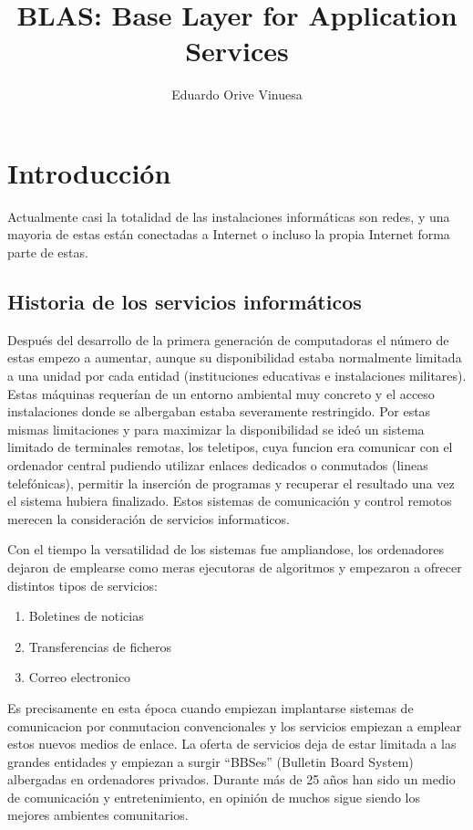 \documentclass[a4paper,spanish,12pt]{book}
\title{BLAS: Base Layer for Application Services}
\author{Eduardo Orive Vinuesa}
\begin{document}
\tableofcontents

\maketitle


\chapter{Introducción}
Actualmente casi la totalidad de las instalaciones inform\'aticas son redes, y una mayoria de estas est\'an conectadas a Internet o incluso la propia Internet forma parte de estas. 



\section{Historia de los servicios informáticos}
Despu\'es del desarrollo de la primera generación de computadoras el número de estas empezo a aumentar, aunque su disponibilidad estaba normalmente limitada a una unidad por cada entidad (instituciones educativas e instalaciones militares). Estas máquinas requerían de un entorno ambiental muy concreto y el acceso instalaciones donde se albergaban estaba severamente restringido. Por estas mismas limitaciones y para maximizar la disponibilidad se ideó un sistema limitado de terminales remotas, los teletipos, cuya funcion era comunicar con el ordenador central pudiendo utilizar enlaces dedicados o conmutados (lineas telefónicas), permitir la inserción de programas y recuperar el resultado una vez el sistema hubiera finalizado. Estos sistemas de comunicación y control remotos merecen la consideración de servicios informaticos.

Con el tiempo la versatilidad de los sistemas fue ampliandose, los ordenadores dejaron de emplearse como meras ejecutoras de algoritmos y empezaron a ofrecer distintos tipos de servicios:
\begin{enumerate}
	\item Boletines de noticias
	\item Transferencias de ficheros
	\item Correo electronico
\end{enumerate}
Es precisamente en esta \'epoca cuando empiezan implantarse sistemas de comunicacion por conmutacion convencionales y los servicios empiezan a emplear estos nuevos medios de enlace. La oferta de servicios deja de estar limitada a las grandes entidades y empiezan a surgir ``BBSes'' (Bulletin Board System) albergadas en ordenadores privados. Durante más de 25 años han sido un medio de comunicación y entretenimiento, en opinión de muchos sigue siendo los mejores ambientes comunitarios. 
\end{document}
